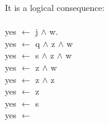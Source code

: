 \documentclass{article}
\def\ans#1{{\color{ans}#1}}
\begin{document}
\begin{enumerate}[label=(\alph*)]
\begin{enumerate}[label=\roman*.]
        \ans{
          It is a logical consequence: \\ \\
          yes $\leftarrow$ j $\wedge$ w. \\
          yes $\leftarrow$ q $\wedge$ z $\wedge$ w\\
          yes $\leftarrow$ s $\wedge$ z $\wedge$ w\\
          yes $\leftarrow$ z $\wedge$ w\\
          yes $\leftarrow$ z $\wedge$ z\\
          yes $\leftarrow$ z \\
          yes $\leftarrow$ s \\
          yes $\leftarrow$ 
      }
    \end{enumerate}
\end{enumerate}

\clearpage
\end{document}
